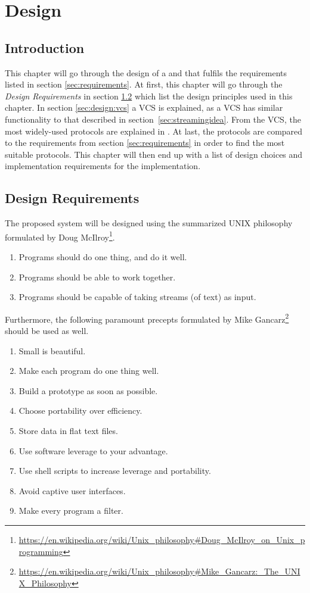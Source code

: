 \chapter{Design} \label{chp:design}

\section{Introduction}
This chapter will go through the design of a  and  that fulfils the requirements listed in section \ref{sec:requirements}.
At first, this chapter will go through the \textit{Design Requirements} in section \ref{sec:design:requirements} which list the design principles used in this chapter.
In section \ref{sec:design:vcs} a \ac{VCS} is explained, as a \ac{VCS} has similar functionality to that described in section~\ref{sec:streamingidea}.
From the \ac{VCS}, the most widely-used protocols are explained in  .
At last, the protocols are compared to the requirements from section \ref{sec:requirements} in order to find the most suitable protocols.
This chapter will then end up with a list of design choices and implementation requirements for the implementation.

\section{Design Requirements} \label{sec:design:requirements}
The proposed system will be designed using the summarized UNIX philosophy formulated by Doug McIlroy\footnote{\url{https://en.wikipedia.org/wiki/Unix_philosophy\#Doug_McIlroy_on_Unix_programming}}.  

\begin{enumerate}[{(a)}]	
\item Programs should do one thing, and do it well.
	\item Programs should be able to work together.
	\item Programs should be capable of taking streams (of text) as input.
\end{enumerate}

\noindent Furthermore, the following paramount precepts formulated by Mike Gancarz\footnote{\url{https://en.wikipedia.org/wiki/Unix_philosophy\#Mike_Gancarz:_The_UNIX_Philosophy}} should be used as well.
\begin{enumerate}[{(A)}]
	\item Small is beautiful.
	\item Make each program do one thing well.
	\item Build a prototype as soon as possible.
	\item Choose portability over efficiency.
	\item Store data in flat text files.
	\item Use software leverage to your advantage.
	\item Use shell scripts to increase leverage and portability.
	\item Avoid captive user interfaces.
	\item Make every program a filter.
\end{enumerate}

